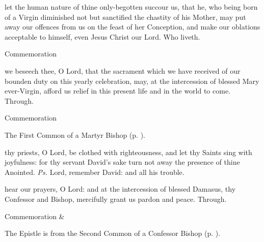 
\secret
{} let the human nature of thine only-begotten succour us, that he, who being born of a Virgin diminished not but sanctified the chastity of his Mother, may put away our offences from us on the feast of her Conception, and make our oblations acceptable to himself, even Jesus Christ our Lord. Who liveth.
\begin{rubric}
    Commemoration 
\end{rubric}


\postcommunion
{} we beseech thee, O Lord, that the sacrament which we have received of our bounden duty on this yearly celebration, may, at the intercession of blessed Mary ever-Virgin, afford us relief in this present life and in the world to come. Through.
\begin{rubric}
    Commemoration 
\end{rubric}



\begin{rubric}
	The First Common of a Martyr Bishop (p. \pageref{CommonMartyrBishopI}).
\end{rubric}


\clearpage
{}

\introit
{} thy priests, O Lord, be clothed with righteousness, and let thy Saints sing with joyfulness: for thy servant David's sake turn not away the presence of thine Anointed. \textit{Ps.} Lord, remember David: and all his trouble.

\collect
{} hear our prayers, O Lord: and at the intercession of blessed Damasus, thy Confessor and Bishop, mercifully grant us pardon and peace. Through.

\begin{rubric}
	Commemoration  \& 
\end{rubric}

\begin{rubric}
	The Epistle is from the Second Common of a Confessor Bishop (p. \pageref{CommonConfessorBishopIIEpistle}).
\end{rubric}

